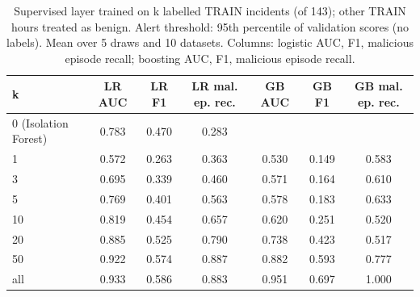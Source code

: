 \begin{table}[t]
\centering
\scriptsize
\caption{Supervised layer trained on k labelled TRAIN incidents (of 143); other TRAIN hours treated as benign. Alert threshold: 95th percentile of validation scores (no labels). Mean over 5 draws and 10 datasets. Columns: logistic AUC, F1, malicious episode recall; boosting AUC, F1, malicious episode recall.}
\label{tab:labelcurve}
\begin{tabular}{lcccccc}
\hline
k & LR AUC & LR F1 & LR mal. ep. rec. & GB AUC & GB F1 & GB mal. ep. rec. \\
\hline
0 (Isolation Forest) & 0.783 & 0.470 & 0.283 &  &  &  \\
1 & 0.572 & 0.263 & 0.363 & 0.530 & 0.149 & 0.583 \\
3 & 0.695 & 0.339 & 0.460 & 0.571 & 0.164 & 0.610 \\
5 & 0.769 & 0.401 & 0.563 & 0.578 & 0.183 & 0.633 \\
10 & 0.819 & 0.454 & 0.657 & 0.620 & 0.251 & 0.520 \\
20 & 0.885 & 0.525 & 0.790 & 0.738 & 0.423 & 0.517 \\
50 & 0.922 & 0.574 & 0.887 & 0.882 & 0.593 & 0.777 \\
all & 0.933 & 0.586 & 0.883 & 0.951 & 0.697 & 1.000 \\
\hline
\end{tabular}
\end{table}
